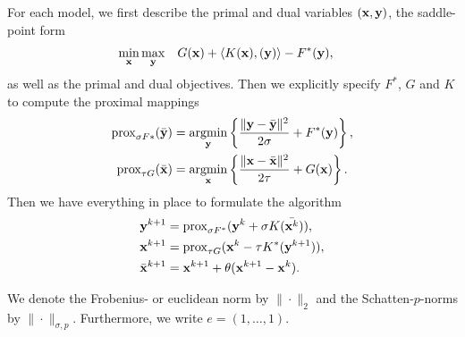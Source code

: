 For each model, we first describe the primal and dual variables
$(\mathbf{x}, \mathbf{y})$, the saddle-point form
\begin{align*}
    \min_{\mathbf{x}} \max_{\mathbf{y}} \quad
        & G(\mathbf{x})
          + \langle K(\mathbf{x}), (\mathbf{y}) \rangle
          - F^*(\mathbf{y}),
\end{align*}
as well as the primal and dual objectives.
Then we explicitly specify $F^*$, $G$ and $K$ to compute the proximal mappings
\begin{align*}
    \Prox_{\sigma F*}(\bar{\mat{y}})
    &= \argmin_{\mat{y}} \left\{
        \frac{
            \|\mat{y}-\bar{\mat{y}}\|^2
        }{2\sigma} + F^*(\mat{y})
    \right\}, \\
    \Prox_{\tau G}(\bar{\mat{x}})
    &= \argmin_{\mat{x}} \left\{
        \frac{
            \|\mat{x}-\bar{\mat{x}}\|^2
        }{2\tau} + G(\mat{x})
    \right\}.
\end{align*}
Then we have everything in place to formulate the algorithm
\begin{align*}
    \mathbf{y}^{k+1} &= \operatorname{prox}_{\sigma F^*}(\mathbf{y}^{k} + \sigma K(\bar{\mathbf{x}^{k}})), \\
    \mathbf{x}^{k+1} &= \operatorname{prox}_{\tau G}(\mathbf{x}^{k} - \tau K^*(\mathbf{y}^{k+1})), \\
    \bar{\mathbf{x}}^{k+1} &= \mathbf{x}^{k+1} + \theta(\mathbf{x}^{k+1}-\mathbf{x}^{k}).
\end{align*}

We denote the Frobenius- or euclidean norm by $\|\cdot\|_{2}$ and the
Schatten-$p$-norms by $\|\cdot\|_{\sigma,p}$.
Furthermore, we write $e = (1,\dots,1)$.
